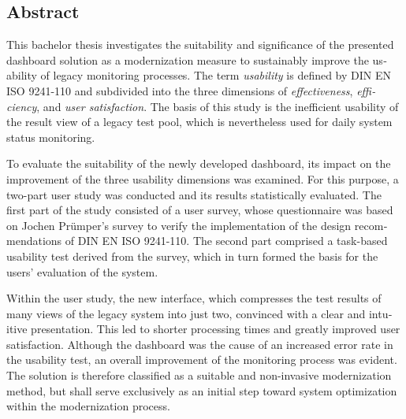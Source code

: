 
\begin{otherlanguage}{american}
	\chapter*{Abstract}    

    This bachelor thesis investigates the suitability and significance of the presented dash\-board solution as a modernization measure to sustainably improve the usability of legacy monitoring processes. The term \textit{usability} is defined by DIN EN ISO 9241-110 and subdivided into the three dimensions of \textit{effectiveness}, \textit{efficiency}, and \textit{user satisfaction}. The basis of this study is the inefficient usability of the result view of a legacy test pool, which is nevertheless used for daily system status monitoring.

    To evaluate the suitability of the newly developed dash\-board, its impact on the improvement of the three usability dimensions was examined. For this purpose, a two-part user study was conducted and its results statistically evaluated. The first part of the study consisted of a user survey, whose questionnaire was based on Jochen Prümper’s survey to verify the implementation of the design recommendations of DIN EN ISO 9241-110. The second part comprised a task-based usability test derived from the survey, which in turn formed the basis for the users’ evaluation of the system.

    Within the user study, the new interface, which compresses the test results of many views of the legacy system into just two, convinced with a clear and intuitive presentation. This led to shorter processing times and greatly improved user satisfaction. Although the dash\-board was the cause of an increased error rate in the usability test, an overall improvement of the monitoring process was evident. The solution is therefore classified as a suitable and non-invasive modernization method, but shall serve exclusively as an initial step toward system optimization within the modernization process.


\end{otherlanguage}
